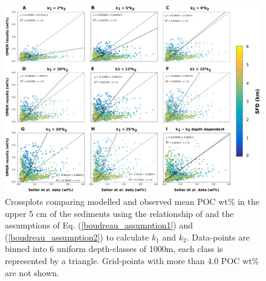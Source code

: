 \documentclass[gmd, manuscript]{copernicus}
\begin{document}
\begin{figure}[htbp]
\begin{center}
	\includegraphics[width=1.0\textwidth]{figures/OMEN-GENIE-Exp/0_Boudreau_CROSSPLOTS_290817.pdf}
	\caption{Crossplots comparing modelled and observed mean POC wt\% in the upper 5 cm of the sediments using the relationship of \citet{boudreau1997diagenetic} and the assumptions of Eq. (\ref{boudreau_assumption1}) and 
	(\ref{boudreau_assumption2}) to calculate $k_1$ and $k_2$.  Data-points are binned into 6 uniform depth-classes of 1000m, each class is represented by a triangle. 
	Grid-points with more than 4.0 POC wt\% are not shown.}
	\label{fig:OMEN_GENIE_Boudreau_results}
\end{center}
\end{figure}
\end{document}
